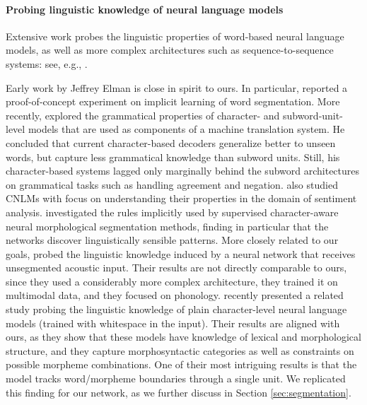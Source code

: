 \paragraph{Probing linguistic knowledge of neural language models}
Extensive work probes the linguistic properties of word-based neural
language models, as well as more complex architectures such as
sequence-to-sequence systems: see, e.g.,
.

Early work by Jeffrey Elman is close in spirit to ours. In particular,
 reported a proof-of-concept experiment on
implicit learning of word segmentation. More recently,
 explored the grammatical properties of
character- and subword-unit-level models that are used as components
of a machine translation system. He concluded that current
character-based decoders generalize better to unseen words, but
capture less grammatical knowledge than subword units. Still, his
character-based systems lagged only marginally behind the subword
architectures on grammatical tasks such as handling agreement and
negation.  also studied CNLMs
with focus on understanding their properties in the domain of
sentiment analysis.  investigated the rules
implicitly used by supervised character-aware neural morphological
segmentation methods, finding in particular that the networks discover
linguistically sensible patterns. More closely related to our goals,
 probed the linguistic knowledge induced
by a neural network that receives unsegmented acoustic input. Their
results are not directly comparable to ours, since they used a
considerably more complex architecture, they trained it on multimodal
data, and they focused on
phonology.  recently presented a
related study probing the linguistic knowledge of plain
character-level neural language models (trained with whitespace in the
input). Their results are aligned with ours, as they show that these
models have knowledge of lexical and morphological structure, and they
capture morphosyntactic categories as well as constraints on possible
morpheme combinations. One of their most intriguing results is that
the model tracks word/morpheme boundaries through a single unit. We
replicated this finding for our network, as we further discuss in
Section \ref{sec:segmentation}.
